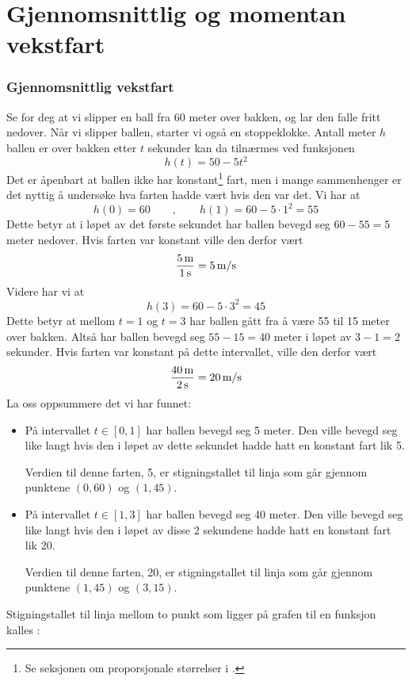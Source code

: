 





	
\section{Gjennomsnittlig og momentan vekstfart}
\subsubsection{Gjennomsnittlig vekstfart}
Se for deg at vi slipper en ball fra 60 meter over bakken, og lar den falle fritt nedover. Når vi slipper ballen, starter vi også en stoppeklokke. Antall meter $ h $ ballen er over bakken etter $ t $ sekunder kan da tilnærmes ved funksjonen
\[ h(t)=50-5t^2 \]
Det er åpenbart at ballen ikke har konstant\footnote{Se seksjonen om proporsjonale størrelser i \am.} fart, men i mange sammenhenger er det nyttig å undersøke hva farten hadde vært hvis den var det. Vi har at
\[ h(0)=60\qquad,\qquad h(1)=60-5\cdot1^2=55 \]
Dette betyr at i løpet av det første sekundet har ballen bevegd seg $ {60-55=5} $ meter nedover. Hvis farten var konstant ville den derfor vært
\[ \frac{5\,\textrm{m}}{1\,\textrm{s}}=5\,\textrm{m/s} \]
Videre har vi at
\[ h(3)=60-5\cdot3^2 =45  \]
Dette betyr at mellom $ {t=1} $ og $ {t=3} $ har ballen gått fra å være 55 til 15 meter over bakken. Altså har ballen bevegd seg $ {55-15=40} $ meter i løpet av $ {3-1=2} $ sekunder. Hvis farten var konstant på dette intervallet, ville den derfor vært
\[ \frac{40\,\textrm{m}}{2\,\textrm{s}}=20\,\textrm{m/s} \] 
\label{eksvekstfart}
\newpage
La oss oppsummere det vi har funnet:
\begin{itemize}
	\item På intervallet $ t\in[0, 1] $ har ballen bevegd seg 5 meter. Den ville bevegd seg like langt hvis den i løpet av dette sekundet hadde hatt en konstant fart lik 5. \os
	
	Verdien til denne farten, 5, er stigningstallet til linja som går gjennom punktene $ (0, 60) $ og $ (1, 45) $.
	\item På intervallet $ t\in[1, 3] $ har ballen bevegd seg 40 meter. Den ville bevegd seg like langt hvis den i løpet av disse 2 sekundene hadde hatt en konstant fart lik 20.\os
	
	Verdien til denne farten, 20, er stigningstallet til linja som går gjennom punktene $ (1, 45) $ og $ (3, 15) $.
\end{itemize}
Stigningstallet til linja mellom to punkt som ligger på grafen til en funksjon kalles :\regv

